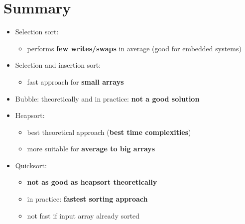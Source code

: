 \documentclass{beamer}[10pt, usepdftitle=false, handout]
\begin{document}
	

	\section{Summary}
	
	\begin{frame}
	
	\begin{itemize}
	\item {Selection sort: 
		\begin{itemize}
		\item {performs \textbf{few writes/swaps} in average (good for embedded systems)}
		\end{itemize}
	}
	\item {Selection and insertion sort: 
		\begin{itemize}
		\item {fast approach for \textbf{small arrays}}
		\end{itemize}
	}
	\item {Bubble: theoretically and in practice: \textbf{not a good solution}}
	\item {Heapsort: \begin{itemize}
		\item {best theoretical approach (\textbf{best time complexities})}
		\item {more suitable for \textbf{average to big arrays}}
		\end{itemize}
	}
	\item {Quicksort: \begin{itemize}
		\item {\textbf{not as good as heapsort theoretically}}
		\item {in practice: \textbf{fastest sorting approach}}
		\item {not fast if input array already sorted}
		\end{itemize}
		}		
	\end{itemize}
	
	\end{frame}	
	
	
\end{document}

